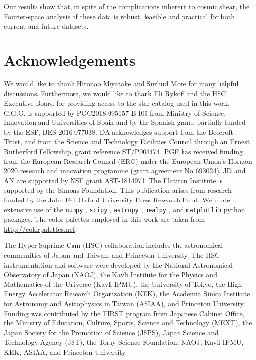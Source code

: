 \documentclass[a4paper,11pt]{article}
\begin{document}
    Our results show that, in spite of the complications inherent to cosmic shear, the Fourier-space analysis of these data is robust, feasible and practical for both current and future datasets.

  \section*{Acknowledgements}
    We would like to thank Hironao Miyatake and Surhud More for many helpful discussions. Furthermore, we would like to thank Eli Rykoff and the HSC Executive Board for providing access to the star catalog used in this work. C.G.G. is supported by PGC2018-095157-B-I00 from Ministry of Science, Innovation and Universities of Spain and by the Spanish grant, partially funded by the ESF, BES-2016-077038. DA acknowledges support from the Beecroft Trust, and from the Science and Technology Facilities Council through an Ernest Rutherford Fellowship, grant reference ST/P004474. PGF has received funding from the European Research Council (ERC) under the European Union’s Horizon 2020 research and innovation programme (grant agreement No 693024). JD and AN are supported by NSF grant AST-1814971. The Flatiron Institute is supported by the Simons Foundation. This publication arises from research funded by the John Fell Oxford University Press Research Fund. 
    We made extensive use of the {\tt numpy} \citep{oliphant2006guide, van2011numpy}, {\tt scipy} \citep{2020SciPy-NMeth}, {\tt astropy} \citep{astropy:2013, astropy:2018}, {\tt healpy} \citep{Zonca2019}, and {\tt matplotlib} \citep{Hunter:2007} python packages. The color palettes employed in this work are taken from \url{http://colorpalettes.net}.

    The Hyper Suprime-Cam (HSC) collaboration includes the astronomical communities of Japan and Taiwan, and Princeton University. The HSC instrumentation and software were developed by the National Astronomical Observatory of Japan (NAOJ), the Kavli Institute for the Physics and Mathematics of the Universe (Kavli IPMU), the University of Tokyo, the High Energy Accelerator Research Organization (KEK), the Academia Sinica Institute for Astronomy and Astrophysics in Taiwan (ASIAA), and Princeton University. Funding was contributed by the FIRST program from Japanese Cabinet Office, the Ministry of Education, Culture, Sports, Science and Technology (MEXT), the Japan Society for the Promotion of Science (JSPS), Japan Science and Technology Agency (JST), the Toray Science Foundation, NAOJ, Kavli IPMU, KEK, ASIAA, and Princeton University. 
    
\end{document}
